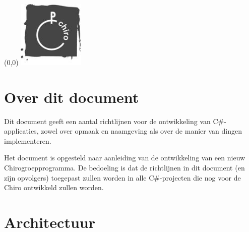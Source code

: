 \documentclass[a4paper,11pt]{article}
\begin{document}
\lstset{language=[Sharp]C, tabsize=3, frame=single, basicstyle=\small, texcl=true}


\begin{textblock}{2}(0,0)
\includegraphics[height=32mm]{chiro-grijs.jpg} \\
\end{textblock}


\vspace*{4mm}




\tableofcontents

\section{Over dit document}

Dit document geeft een aantal richtlijnen voor de ontwikkeling van C\#-applicaties, zowel over
opmaak en naamgeving als over de manier van dingen implementeren.

Het document is opgesteld naar aanleiding van de ontwikkeling van een nieuw Chirogroepprogramma.
De bedoeling is dat de richtlijnen in dit document (en zijn opvolgers) toegepast zullen worden
in alle C\#-projecten die nog voor de Chiro ontwikkeld zullen worden.

\section{Architectuur}
\end{document}
